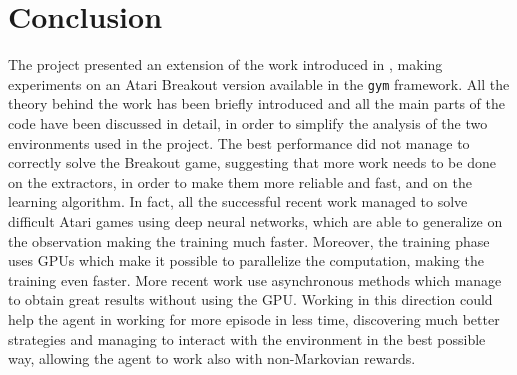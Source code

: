 \section{Conclusion}
The project presented an extension of the work introduced in
\cite{DBLP:journals/corr/abs-1807-06333}, making experiments on an Atari
Breakout version available in the \texttt{gym} framework. All the theory
behind the work has been briefly introduced and all the main parts of the
code have been discussed in detail, in order to simplify the analysis of the
two environments used in the project. The best performance did not manage
to correctly solve the Breakout game, suggesting that more work needs to be
done on the extractors, in order to make them more reliable and fast,
and on the learning algorithm. In fact, all the successful recent work
managed to solve difficult Atari games using deep neural networks, which are
able to generalize on the observation making the training much faster.
Moreover, the training phase uses GPUs which make it possible to parallelize
the computation, making the training even faster. More recent work
use asynchronous methods \cite{DBLP:journals/corr/MnihBMGLHSK16} which manage
to obtain great results without using the GPU. Working in this direction could
help the agent in working for more episode in less time, discovering much
better strategies and managing to interact with the environment in the best
possible way, allowing the agent to work also with non-Markovian rewards.
